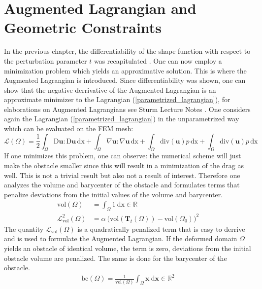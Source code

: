\section{Augmented Lagrangian and Geometric Constraints}

In the previous chapter, the differentiability of the shape function with respect to the perturbation 
parameter $t$ was recapitulated \cite{nearly_conformal_paper}. One can now employ a minimization problem
which yields an approximative solution. This is where the Augmented Lagrangian is introduced. Since differentiability was shown,
one can show that the negative derrivative of the Augmented Lagrangian is an approximate minimizer to the 
Lagrangian (\ref{parametrized_lagrangian}), for elaborations on Augmented Lagrangians see Sturm Lecture Notes \cite{lecture_notes_sturm}. 
One considers again the Lagrangian (\ref{parametrized_lagrangian}) in the unparametrized way which can be evaluated on the FEM mesh:
\begin{equation}\label{basic_lagrangian}
    \mathcal{L}(\Omega) = \frac{1}{2} \int_{\Omega} \mathrm{D}\mathbf{u}: \mathrm{D} \mathbf{u} \, \mathrm{dx} + 
	\int_{\Omega} \nabla \mathbf{u} : \nabla \mathbf{u} \, \mathrm{dx} + \int_{\Omega} \mathrm{div}(\mathbf{u})p \, \mathrm{dx} +
	 \int_{\Omega} \mathrm{div}(\mathbf{u})p \, \mathrm{dx}
\end{equation}
If one minimizes this problem, one can observe: the numerical scheme will just make the obstacle smaller since this will 
result in a minimization of the drag as well. This is not a trivial result but also not a result of interest. Therefore one analyzes the 
volume and barycenter of the obstacle and formulates terms that penalize deviations from the initial values of the volume and barycenter.
\begin{align}
    \mathrm{vol}(\Omega) &= \int_{\Omega} 1 \ \mathrm{dx} \in \mathbb{R} \\
    \mathcal{L}^2_{\mathrm{vol}}(\Omega) &= \alpha \ \Big( \mathrm{vol}( \mathbf{T}_{t}(\Omega) )-\mathrm{vol}(\Omega_0) \Big) ^2
\end{align}
The quantity $\mathcal{L}_{\mathrm{vol}}(\Omega)$ is a quadratically penalized term that is easy to derrive and is used to formulate 
the Augmented Lagrangian. If the deformed domain $\Omega$ yields an obstacle of identical volume, the term is zero, deviations 
from the initial obstacle volume are penalized. The same is done for the barycenter of the obstacle. 
\begin{align}
    \mathrm{bc}(\Omega) =
    \frac{1}{\mathrm{vol}(\Omega)}\int_{\Omega} \mathbf{x} \ \mathrm{d} \mathbf{x} \in \mathbb{R}^2
\end{align}
